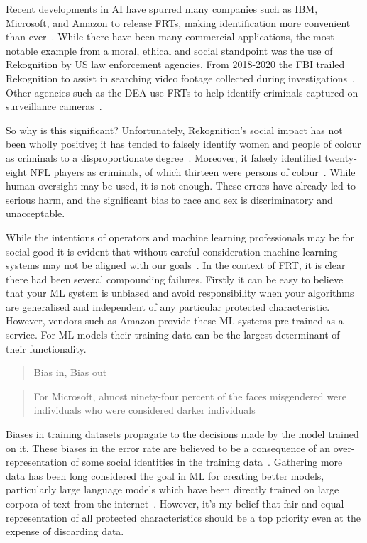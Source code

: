 \documentclass[]{final_report}
\begin{document}
Recent developments in AI have spurred many companies such as IBM, Microsoft, and Amazon to release FRTs, making identification more convenient than ever~\cite{facialRecognitionEthicsSurvay}. While there have been many commercial applications, the most notable example from a moral, ethical and social standpoint was the use of Rekognition by US law enforcement agencies. From 2018-2020 the FBI trailed Rekognition to assist in searching video footage collected during investigations~\cite{facialRecognitionBias}. Other agencies such as the DEA use FRTs to help identify criminals captured on surveillance cameras~\cite{facialRecognitionBias}. 

So why is this significant? Unfortunately, Rekognition's social impact has not been wholly positive; it has tended to falsely identify women and people of colour as criminals to a disproportionate degree~\cite{legislatingRekognition}. Moreover, it falsely identified twenty-eight NFL players as
criminals, of which thirteen were persons of colour~\cite{facialRecognitionBias}. While human oversight may be used, it is not enough. These errors have already led to serious harm, and the significant bias to race and sex is discriminatory and unacceptable.

While the intentions of operators and machine learning professionals may be for social good it is evident that without careful consideration machine learning systems may not be aligned with our goals~\cite{AIAllignemnt}. In the context of FRT, it is clear there had been several compounding failures. Firstly it can be easy to believe that your ML system is unbiased and avoid responsibility when your algorithms are generalised and independent of any particular protected characteristic. However, vendors such as Amazon provide these ML systems pre-trained as a service. For ML models their training data can be the largest determinant of their functionality. 

\begin{quote}
  Bias in, Bias out~\cite{facialRecognitionBias}
\end{quote}

\begin{quote}
  For Microsoft, almost ninety-four percent of
  the faces misgendered were individuals who were considered darker individuals~\cite{facialRecognitionBias}
\end{quote}

Biases in training datasets propagate to the decisions made by the model trained on it. These biases in the error rate are believed to be a consequence of an over-representation of some social identities in the training data~\cite{LLMSocialEthicalRisks}. Gathering more data has been long considered the goal in ML for creating better models, particularly large language models which have been directly trained on large corpora of text from the internet~\cite{LLMSocialEthicalRisks}. However, it's my belief that fair and equal representation of all protected characteristics should be a top priority even at the expense of discarding data.
\end{document}
